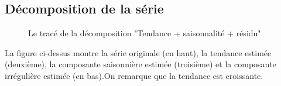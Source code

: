 	\subsection{Décomposition de la série}
	\begin{figure}[H]
		\centering
		\caption{Le tracé de la décomposition "Tendance + saisonnalité + résidu"}
		\label{fig:dec}
	\end{figure}
	La figure ci-dessus montre la série originale (en haut), la tendance estimée (deuxième), la composante saisonnière estimée (troisième) et la composante irrégulière estimée (en bas).On remarque que la tendance est croissante.
